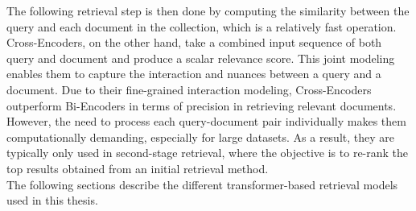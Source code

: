 The following retrieval step is then done by computing the similarity between the query and each document in the collection, which is a relatively fast operation.
\\
Cross-Encoders, on the other hand, take a combined input sequence of both query and document and produce a scalar relevance score.
This joint modeling enables them to capture the interaction and nuances between a query and a document.
Due to their fine-grained interaction modeling, Cross-Encoders outperform Bi-Encoders in terms of precision in retrieving relevant documents.
However, the need to process each query-document pair individually makes them computationally demanding, especially for large datasets.
As a result, they are typically only used in second-stage retrieval, where the objective is to re-rank the top results obtained from an initial retrieval method.
\\
The following sections describe the different transformer-based retrieval models used in this thesis.
